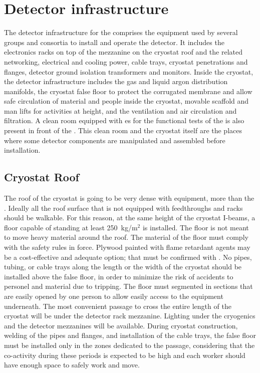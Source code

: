 \section{Detector infrastructure}
\label{ch:dp-tc-infrastructure}

The detector infrastructure for the  comprises the equipment used by several groups and consortia to install and operate the detector.
It includes the electronics racks on top of the mezzanine on the cryostat roof and the related networking, electrical and cooling power, cable trays, cryostat penetrations and flanges, detector ground isolation transformers and monitors.
Inside the cryostat, the detector infrastructure includes the gas and liquid argon distribution manifolds, the cryostat false floor to protect the corrugated membrane and allow safe circulation of material and people inside the cryostat, movable scaffold and man lifts for activities at height, and the ventilation and air circulation and filtration.
A clean room equipped with  \coldbox{}es for the functional tests of the  is also present in front of the .
This clean room and the cryostat itself are the places where some detector components are manipulated and assembled before installation.

\subsection{Cryostat Roof}
The roof of the  cryostat is going to be very dense with equipment, more than the .
Ideally all the roof surface that is not equipped with feedthroughs and racks should be walkable.
For this reason, at the same height of the cryostat I-beams, a floor capable of standing at least 250~kg/m$^2$ is installed.
The floor is not meant to move heavy material around the roof.
The material of the floor must comply with the safety rules in force.
Plywood painted with flame retardant agents may be a cost-effective and adequate option; that must be confirmed with .
No pipes, tubing, or cable trays along the length or the width of the cryostat should be installed above the false floor, in order to minimize the risk of accidents to personel and material due to tripping.
The floor must segmented in sections that are easily opened by one person to allow easily access to the equipment underneath.
The most convenient passage to cross the entire length of the cryostat will be under the detector rack mezzanine.
Lighting under the cryogenics and the detector mezzanines will be available.
During cryostat construction, welding of the pipes and flanges, and installation of the cable trays, the false floor must be installed only in the zones dedicated to the passage, considering that the co-activity during these periods is expected to be high and each worker should have enough space to safely work and move.

